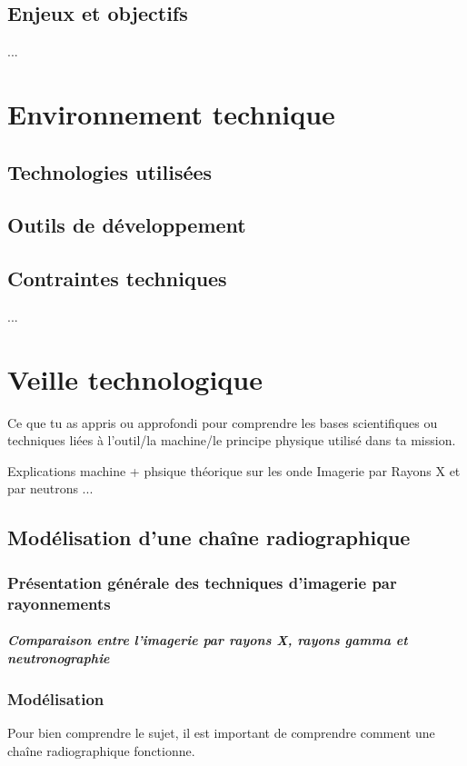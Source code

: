 \documentclass[12pt,a4paper]{report}
\begin{document}
\section{Enjeux et objectifs}
... %



\chapter{Environnement technique}
\section{Technologies utilisées}
\section{Outils de développement}
\section{Contraintes techniques}
... %

\chapter{Veille technologique}
Ce que tu as appris ou approfondi pour comprendre les bases scientifiques ou techniques liées à l’outil/la machine/le principe physique utilisé dans ta mission.

Explications machine + phsique théorique sur les onde
Imagerie par Rayons X et par neutrons
... %
\section{Modélisation d'une chaîne radiographique}
\subsection{Présentation générale des techniques d'imagerie par rayonnements}
\paragraph{Comparaison entre l’imagerie par rayons X, rayons gamma et neutronographie}

\subsection{Modélisation}
Pour bien comprendre le sujet, il est important de comprendre comment une chaîne radiographique fonctionne.
\end{document}
